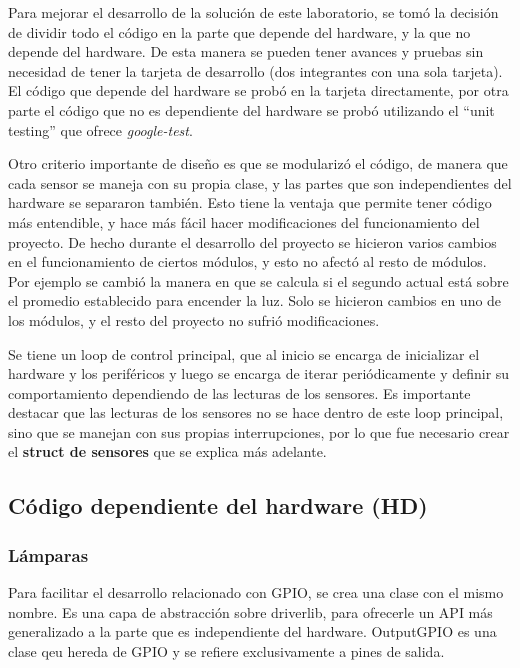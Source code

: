 Para mejorar el desarrollo de la solución de este laboratorio, se tomó la decisión de dividir todo
el código en la parte que depende del hardware, y la que no depende del hardware. De esta manera se
pueden tener avances y pruebas sin necesidad de tener la tarjeta de desarrollo (dos integrantes con
una sola tarjeta). El código que depende del hardware se probó en la tarjeta directamente, por otra
parte el código que no es dependiente del hardware se probó utilizando el ``unit testing'' que
ofrece \textit{google-test}.

Otro criterio importante de diseño es que se modularizó el código, de manera que cada sensor se
maneja con su propia clase, y las partes que son independientes del hardware se separaron
también. Esto tiene la ventaja que permite tener código más entendible, y hace más fácil hacer
modificaciones del funcionamiento del proyecto. De hecho durante el desarrollo del proyecto se
hicieron varios cambios en el funcionamiento de ciertos módulos, y esto no afectó al resto de
módulos. Por ejemplo se cambió la manera en que se calcula si el segundo actual está sobre el
promedio establecido para encender la luz. Solo se hicieron cambios en uno de los módulos, y el
resto del proyecto no sufrió modificaciones.

Se tiene un loop de control principal, que al inicio se encarga de inicializar el hardware y los
periféricos y luego se encarga de iterar periódicamente y definir su comportamiento dependiendo de
las lecturas de los sensores. Es importante destacar que las lecturas de los sensores no se hace
dentro de este loop principal, sino que se manejan con sus propias interrupciones, por lo que fue
necesario crear el \textbf{struct de sensores} que se explica más adelante. 


\subsection{Código dependiente del hardware (HD)}

\subsubsection{Lámparas}
Para facilitar el desarrollo relacionado con GPIO, se crea una clase con el mismo nombre. Es una
capa de abstracción sobre driverlib, para ofrecerle un API más generalizado a la parte que es
independiente del hardware. OutputGPIO es una clase qeu hereda de GPIO y se refiere exclusivamente a
pines de salida.

